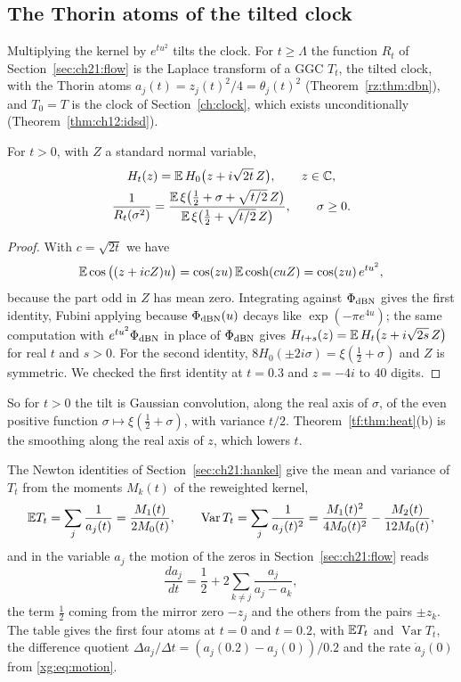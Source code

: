 \subsection{The Thorin atoms of the tilted clock}\label{sec:xg:tilt}

Multiplying the kernel by $e^{tu^2}$ tilts the clock. For $t\ge\Lambda$ the function $R_t$ of Section~\ref{sec:ch21:flow} is the Laplace transform of a GGC $T_t$, the tilted clock, with the Thorin atoms $a_j(t)=z_j(t)^2/4=\theta_j(t)^2$ (Theorem~\ref{rz:thm:dbn}), and $T_0=T$ is the clock of Section~\ref{ch:clock}, which exists unconditionally (Theorem~\ref{thm:ch12:idsd}).

\begin{proposition}\label{xg:prop:gauss}
For $t>0$, with $Z$ a standard normal variable,
\begin{gather*}
H_t(z)=\mathbb{E}\,H_0\big(z+i\sqrt{2t}\,Z\big),\qquad z\in\mathbb{C},\\
\frac1{R_t(\sigma^2)}=\frac{\mathbb{E}\,\xi\big(\frac12+\sigma+\sqrt{t/2}\,Z\big)}{\mathbb{E}\,\xi\big(\frac12+\sqrt{t/2}\,Z\big)},\qquad\sigma\ge0.
\end{gather*}
\end{proposition}

\begin{proof}
With $c=\sqrt{2t}$ we have
\[
\mathbb{E}\cos\big((z+icZ)u\big)=\cos(zu)\,\mathbb{E}\cosh(cuZ)=\cos(zu)\,e^{tu^2},
\]
because the part odd in $Z$ has mean zero. Integrating against $\Phi_{\rm dBN}$ gives the first identity, Fubini applying because $\Phi_{\rm dBN}(u)$ decays like $\exp(-\pi e^{4u})$; the same computation with $e^{tu^2}\Phi_{\rm dBN}$ in place of $\Phi_{\rm dBN}$ gives $H_{t+s}(z)=\mathbb{E}\,H_t\big(z+i\sqrt{2s}\,Z\big)$ for real $t$ and $s>0$. For the second identity, $8H_0(\pm2i\sigma)=\xi(\frac12+\sigma)$ and $Z$ is symmetric. We checked the first identity at $t=0.3$ and $z=-4i$ to $40$ digits.
\end{proof}

So for $t>0$ the tilt is Gaussian convolution, along the real axis of $\sigma$, of the even positive function $\sigma\mapsto\xi(\frac12+\sigma)$, with variance $t/2$. Theorem~\ref{tf:thm:heat}(b) is the smoothing along the real axis of $z$, which lowers $t$.

The Newton identities of Section~\ref{sec:ch21:hankel} give the mean and variance of $T_t$ from the moments $M_k(t)$ of the reweighted kernel,
\[
\mathbb{E} T_t=\sum_j\frac1{a_j(t)}=\frac{M_1(t)}{2M_0(t)},\qquad\operatorname{Var}T_t=\sum_j\frac1{a_j(t)^2}=\frac{M_1(t)^2}{4M_0(t)^2}-\frac{M_2(t)}{12M_0(t)},
\]
and in the variable $a_j$ the motion of the zeros in Section~\ref{sec:ch21:flow} reads
\begin{equation}\label{xg:eq:motion}
\frac{da_j}{dt}=\frac12+2\sum_{k\ne j}\frac{a_j}{a_j-a_k},
\end{equation}
the term $\frac12$ coming from the mirror zero $-z_j$ and the others from the pairs $\pm z_k$. The table gives the first four atoms at $t=0$ and $t=0.2$, with $\mathbb{E} T_t$ and $\operatorname{Var}T_t$, the difference quotient $\Delta a_j/\Delta t=(a_j(0.2)-a_j(0))/0.2$ and the rate $\dot a_j(0)$ from \eqref{xg:eq:motion}.

